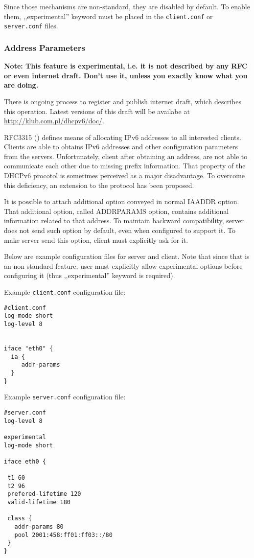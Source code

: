 Since those mechanisms are non-standard, they are disabled by
default. To enable them, ,,experimental'' keyword must be placed in
the \verb+client.conf+ or \verb+server.conf+ files.

\subsubsection{Address Parameters}
\label{feature-addr-params}
\textbf{Note: This feature is experimental, i.e. it is not described
by any RFC or even internet draft. Don't use it, unless you exactly
know what you are doing.}

There is ongoing process to register and publish internet draft,
which describes this operation. Latest versions of this draft will be
availabe at \url{http://klub.com.pl/dhcpv6/doc/}.

RFC3315 (\cite{rfc3315}) defines means of allocating IPv6 addresses to
all interested clients. Clients are able to obtains IPv6 addresses and
other configuration parameters from the servers. Unfortunately, client
after obtaining an address, are not able to communicate each other due
to missing prefix information. That property of the DHCPv6 procotol is
sometimes perceived as a major disadvantage. To overcome this
deficiency, an extension to the protocol has been proposed.

It is possible to attach additional option conveyed in normal IAADDR
option. That additional option, called ADDRPARAMS option, contains
additional information related to that address. To maintain backward
compatibility, server does not send such option by default, even when
configured to support it. To make server send this option, client must
explicitly ask for it.

Below are example configuration files for server and client. Note that
since that is an non-standard feature, user must explicitly allow
experimental options before configuring it (thus ,,experimental''
keyword is required).

Example \verb+client.conf+ configuration file:

\begin{lstlisting}
#client.conf
log-mode short
log-level 8


iface "eth0" {
  ia {
     addr-params
  }
}
\end{lstlisting}

Example \verb+server.conf+ configuration file:

\begin{lstlisting}
#server.conf
log-level 8

experimental
log-mode short

iface eth0 {

 t1 60
 t2 96
 prefered-lifetime 120
 valid-lifetime 180

 class {
   addr-params 80
   pool 2001:458:ff01:ff03::/80
 }
}
\end{lstlisting}

